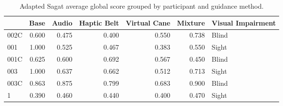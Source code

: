 
\begin{table}[!htb]
\centering
\caption{Adapted Sagat average global score grouped by participant and guidance method.}
\label{tab:sagat_average}
\begin{tabular}{lrrrrrl}
\toprule
{} &  Base &  Audio &  Haptic Belt &  Virtual Cane &  Mixture & Visual Impairment \\
\midrule
002C & 0.600 &  0.475 &        0.400 &         0.550 &    0.738 &             Blind \\
001  & 1.000 &  0.525 &        0.467 &         0.383 &    0.550 &             Sight \\
001C & 0.625 &  0.600 &        0.692 &         0.567 &    0.450 &             Blind \\
003  & 1.000 &  0.637 &        0.662 &         0.512 &    0.713 &             Sight \\
003C & 0.863 &  0.875 &        0.799 &         0.683 &    0.900 &             Blind \\
1    & 0.390 &  0.460 &        0.440 &         0.400 &    0.470 &             Sight \\
\bottomrule
\end{tabular}
\end{table}

